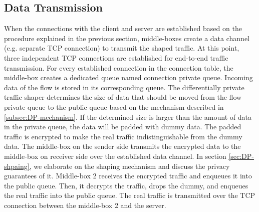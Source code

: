 \subsection{Data Transmission}
When the connections with the client and server are established based on the procedure explained in the previous section, middle-boxes create a data channel (e.g. separate TCP connection) to transmit the shaped traffic.
At this point, three independent TCP connections are established for end-to-end traffic transmission.
For every established connection in the connection table, the middle-box creates a dedicated queue named connection private queue. 
Incoming data of the flow is stored in its corresponding queue.
The differentially private traffic shaper determines the size of data that should be moved from the flow private queue to the public queue based on the mechanism described in \ref{subsec:DP-mechanism}. 
If the determined size is larger than the amount of data in the private queue, the data will be padded with dummy data.
The padded traffic is encrypted to make the real traffic indistinguishable from the dummy data.
The middle-box on the sender side transmits the encrypted data to the middle-box on receiver side over the established data channel.
In section \ref{sec:DP-shpaing}, we elaborate on the shaping mechanism and discuss the privacy guarantees of it.
Middle-box 2 receives the encrypted traffic and enqueues it into the public queue.
Then, it decrypts the traffic, drops the dummy, and enqueues the real traffic into the public queue.
The real traffic is transmitted over the TCP connection between the middle-box 2 and the server.


